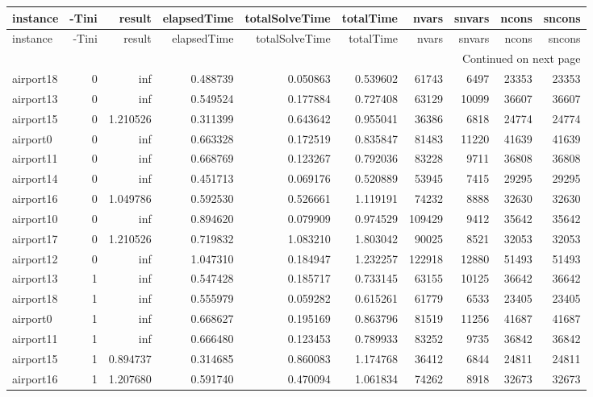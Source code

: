 
\begin{longtable}{|l|r|r|r|r|r|r|r|r|r|}
\toprule
instance & -Tini & result & elapsedTime & totalSolveTime & totalTime & nvars & snvars & ncons & sncons \\
\midrule
\endfirsthead
\toprule
instance & -Tini & result & elapsedTime & totalSolveTime & totalTime & nvars & snvars & ncons & sncons \\
\midrule
\endhead
\midrule
\multicolumn{10}{r}{Continued on next page} \\
\midrule
\endfoot
\bottomrule
\endlastfoot
airport18 & 0 & inf & 0.488739 & 0.050863 & 0.539602 & 61743 & 6497 & 23353 & 23353 \\
airport13 & 0 & inf & 0.549524 & 0.177884 & 0.727408 & 63129 & 10099 & 36607 & 36607 \\
airport15 & 0 & 1.210526 & 0.311399 & 0.643642 & 0.955041 & 36386 & 6818 & 24774 & 24774 \\
airport0 & 0 & inf & 0.663328 & 0.172519 & 0.835847 & 81483 & 11220 & 41639 & 41639 \\
airport11 & 0 & inf & 0.668769 & 0.123267 & 0.792036 & 83228 & 9711 & 36808 & 36808 \\
airport14 & 0 & inf & 0.451713 & 0.069176 & 0.520889 & 53945 & 7415 & 29295 & 29295 \\
airport16 & 0 & 1.049786 & 0.592530 & 0.526661 & 1.119191 & 74232 & 8888 & 32630 & 32630 \\
airport10 & 0 & inf & 0.894620 & 0.079909 & 0.974529 & 109429 & 9412 & 35642 & 35642 \\
airport17 & 0 & 1.210526 & 0.719832 & 1.083210 & 1.803042 & 90025 & 8521 & 32053 & 32053 \\
airport12 & 0 & inf & 1.047310 & 0.184947 & 1.232257 & 122918 & 12880 & 51493 & 51493 \\
airport13 & 1 & inf & 0.547428 & 0.185717 & 0.733145 & 63155 & 10125 & 36642 & 36642 \\
airport18 & 1 & inf & 0.555979 & 0.059282 & 0.615261 & 61779 & 6533 & 23405 & 23405 \\
airport0 & 1 & inf & 0.668627 & 0.195169 & 0.863796 & 81519 & 11256 & 41687 & 41687 \\
airport11 & 1 & inf & 0.666480 & 0.123453 & 0.789933 & 83252 & 9735 & 36842 & 36842 \\
airport15 & 1 & 0.894737 & 0.314685 & 0.860083 & 1.174768 & 36412 & 6844 & 24811 & 24811 \\
airport16 & 1 & 1.207680 & 0.591740 & 0.470094 & 1.061834 & 74262 & 8918 & 32673 & 32673 \\

\end{longtable}
